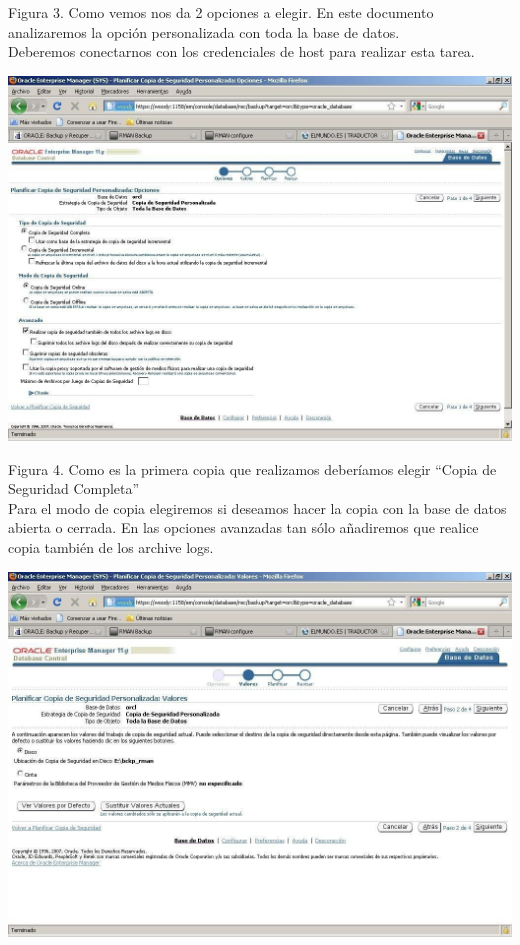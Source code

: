 \begin{enumerate}[1.]
\begin{center}
	\end{center}
	Figura 3. Como vemos nos da 2 opciones a elegir. En este documento analizaremos la opción personalizada con toda la base de datos.
  	\\ Deberemos conectarnos con los credenciales de host para realizar esta tarea.
	\begin{center}
	\includegraphics[width=15cm]{./Imagenes/img-4-2-3}  
	\end{center}
	Figura 4. Como  es  la  primera  copia  que  realizamos  deberíamos  elegir  “Copia  de  Seguridad Completa”
	\\Para el modo de copia elegiremos si deseamos hacer la copia con la base de datos abierta o cerrada. En las opciones avanzadas tan sólo añadiremos que realice copia también de los archive logs.
	\begin{center}
	\includegraphics[width=15cm]{./Imagenes/img-4-2-4}  

\end{center}
\end{enumerate}

